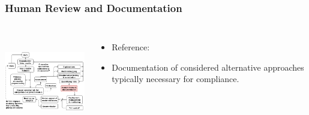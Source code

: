 \documentclass[11pt,
               aspectratio=169,
               hyperref={colorlinks}
               ]{beamer}
\begin{document}
			\begin{frame}
			
				\frametitle{Human Review and Documentation}		
				
				\begin{columns}
		
					\centering
					\includegraphics[height=120pt]{../img/hr.png}
					
					\vspace{-5pt}
					\begin{itemize}
						\item Reference: 
						\item Documentation of considered alternative approaches typically necessary for compliance.
					\end{itemize}
					
				\end{columns}
			
			\end{frame}
	
\end{document}

